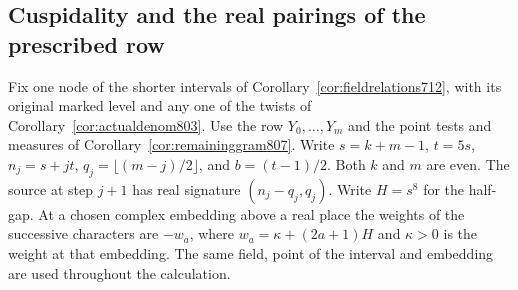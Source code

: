\documentclass[a4paper,11pt]{article}
\theoremstyle{definition}
\theoremstyle{remark}
\numberwithin{equation}{section}
\begin{document}
\subsection{Cuspidality and the real pairings of the prescribed row}
\label{sec:actualrow809}
Fix one node of the shorter intervals of
Corollary~\ref{cor:fieldrelations712}, with its original marked level
and any one of the twists of Corollary~\ref{cor:actualdenom803}.
Use the row \(Y_0,\ldots,Y_m\) and the point tests and measures of
Corollary~\ref{cor:remaininggram807}. Write \(s=k+m-1\), \(t=5s\),
\(n_j=s+jt\), \(q_j=\lfloor(m-j)/2\rfloor\), and \(b=(t-1)/2\).
Both \(k\) and \(m\) are even. The source at step \(j+1\) has real
signature \((n_j-q_j,q_j)\). Write \(H=s^8\) for the half-gap.
At a chosen complex embedding above a real place the weights of the
successive characters are \(-w_a\), where
\(w_a=\kappa+(2a+1)H\) and \(\kappa>0\) is the weight at that
embedding. The same field, point of the interval and embedding are
used throughout the calculation.
\end{document}
